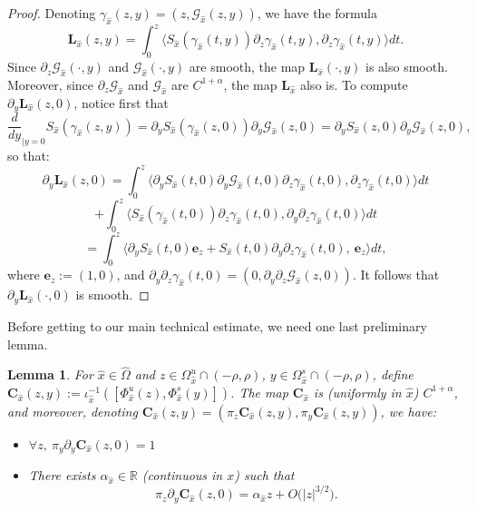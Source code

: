 \documentclass[a4paper]{article}
\newtheorem{lemma}[theorem]{Lemma}
\theoremstyle{definition}
\begin{document}
\begin{proof}
Denoting $\gamma_{\widehat{x}}(z,y) = (z,\mathcal{G}_{\widehat{x}}(z,y))$, we have the formula
$$ \mathbf{L}_{\widehat{x}}(z,y) = \int_0^z \langle S_{\widehat{x}}(\gamma_{\widehat{x}}(t,y)) \partial_z{\gamma}_{\widehat{x}}(t,y) , \partial_z{\gamma}_{\widehat{x}}(t,y) \rangle dt .$$
Since $\partial_z \mathcal{G}_{\widehat{x}}(\cdot,y)$ and $\mathcal{G}_{\widehat{x}}(\cdot,y)$ are smooth, the map $\mathbf{L}_{\widehat{x}}(\cdot,y)$ is also smooth. Moreover, since $\partial_z \mathcal{G}_{\widehat{x}}$ and $\mathcal{G}_{\widehat{x}}$ are $C^{1+\alpha}$, the map $\mathbf{L}_{\widehat{x}}$ also is. To compute $\partial_y \mathbf{L}_{\widehat{x}}(z,0)$, notice first that $$\frac{d}{dy}_{|y=0} S_{\widehat{x}}(\gamma_{\widehat{x}}(z,y)) = \partial_y S_{\widehat{x}}(\gamma_{\widehat{x}}(z,0)) \partial_y \mathcal{G}_{\widehat{x}}(z,0) = \partial_y S_{\widehat{x}}(z,0) \partial_y \mathcal{G}_{\widehat{x}}(z,0),$$ so that:
$$ \partial_y\mathbf{L}_{\widehat{x}}(z,0) = \int_0^z \big\langle  \partial_y S_{\widehat{x}}(t,0) \partial_y \mathcal{G}_{\widehat{x}}(t,0) \partial_z \gamma_{\widehat{x}}(t,0), \partial_z \gamma_{\widehat{x}}(t,0) \big\rangle dt $$ $$+ \int_0^z \langle S_{\widehat{x}}(\gamma_{\widehat{x}}(t,0)) \partial_z \gamma_{\widehat{x}}(t,0), \partial_y \partial_z \gamma_{\widehat{x}}(t,0) \rangle dt $$
$$ = \int_0^z \big\langle  \partial_y S_{\widehat{x}}(t,0) \mathbf{e}_z + S_{\widehat{x}}(t,0) \partial_y \partial_z \gamma_{\widehat{x}}(t,0), \ \mathbf{e}_z \big\rangle dt, $$
where $\mathbf{e}_z := (1,0)$, and $\partial_y \partial_z \gamma_{\widehat{x}}(t,0) = (0,\partial_y \partial_z \mathcal{G}_{\widehat{x}}(z,0))$. It follows that $\partial_y \mathbf{L}_{\widehat{x}}(\cdot,0)$ is smooth.
\end{proof}

Before getting to our main technical estimate, we need one last preliminary lemma.

\begin{lemma}
For ${\widehat{x}} \in \widehat{\Omega}$ and $z \in \Omega_{\widehat{x}}^u \cap (-\rho,\rho)$, $y \in \Omega_{\widehat{x}}^s \cap (-\rho,\rho)$, define
$ \mathbf{C}_{\widehat{x}}(z,y) := \iota_{\widehat{x}}^{-1}( [\Phi_{\widehat{x}}^u(z),\Phi_{\widehat{x}}^s(y)] ) $. The map $\mathbf{C}_{\widehat{x}}$ is (uniformly in ${\widehat{x}}$) $C^{1+\alpha}$, and moreover, denoting $\mathbf{C}_{\widehat{x}}(z,y) = ( \pi_z \mathbf{C}_{\widehat{x}}(z,y),\pi_y \mathbf{C}_{\widehat{x}}(z,y) )$, we have:
\begin{itemize}
\item $\forall z, \ \pi_y \partial_y \mathbf{C}_{\widehat{x}}(z,0) = 1$
\item There exists $\alpha_{\widehat{x}} \in \mathbb{R}$ (continuous in $x$) such that $$ \pi_z \partial_y \mathbf{C}_{\widehat{x}}(z,0) = \alpha_{\widehat{x}} z + O\big(|z|^{3/2}\big) .$$
\end{itemize}
\end{lemma}
\end{document}
